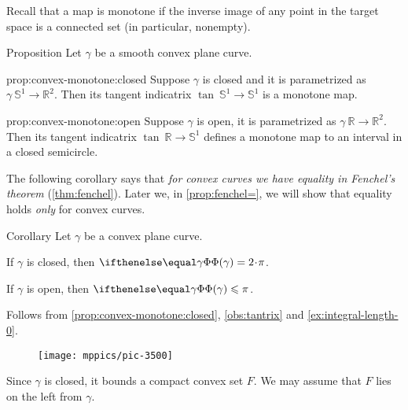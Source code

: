 Recall that a map is monotone if the inverse image of any point in the target space is a connected set (in particular, nonempty).

\begin{thm}{Proposition}\label{prop:convex-monotone}
Let $\gamma$ be a smooth convex plane curve.

\begin{subthm}{prop:convex-monotone:closed}
Suppose $\gamma$ is closed and it is parametrized as $\gamma\:\mathbb{S}^1\to \mathbb{R}^2$.
Then its tangent indicatrix $\tan\:\mathbb{S}^1\to\mathbb{S}^1$ is a monotone map.
\end{subthm}

\begin{subthm}{prop:convex-monotone:open}
Suppose $\gamma$ is open, it is parametrized as $\gamma\:\mathbb{R}\to \mathbb{R}^2$.
Then its tangent indicatrix $\tan\:\mathbb{R}\to \mathbb{S}^1$ defines a monotone map to an interval in a closed semicircle.
\end{subthm}

\end{thm}

The following corollary says that \textit{for convex curves we have equality in Fenchel's theorem} (\ref{thm:fenchel}).
Later we, in \ref{prop:fenchel=}, we will show that equality holds \textit{only} for convex curves.

\begin{thm}{Corollary}\label{cor:fenchel=convex}
Let $\gamma$ be a convex plane curve.

\begin{subthm}{}
If $\gamma$ is closed, then $\tc\gamma=2\cdot\pi$.
\end{subthm}

\begin{subthm}{}
If $\gamma$ is open, then $\tc\gamma\le\pi$.
\end{subthm}

\end{thm}

Follows from \ref{prop:convex-monotone:closed}, \ref{obs:tantrix} and \ref{ex:integral-length-0}.
\qeds

\begin{wrapfigure}{r}{32 mm}
\vskip-0mm
\centering
\texttt{[image: mppics/pic-3500]}
\vskip0mm
\end{wrapfigure}

Since $\gamma$ is closed, it bounds a compact convex set $F$.
We may assume that $F$ lies on the left from $\gamma$.

